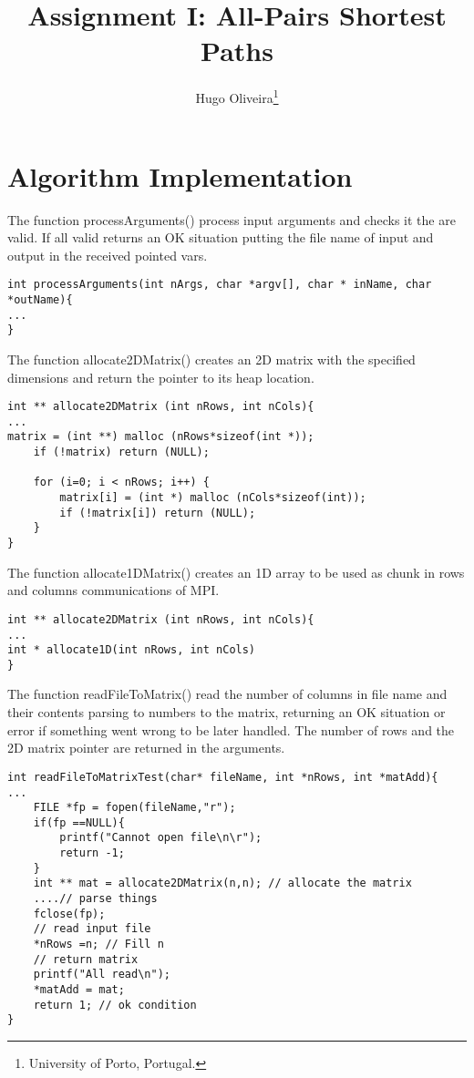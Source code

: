 \documentclass[10pt,a4paper,final]{report}
\begin{document}
\title{\LARGE \bf
 Assignment I: All-Pairs Shortest Paths
}


\author{Hugo Oliveira\footnote{University of Porto, Portugal.}}
\maketitle


\section{Algorithm Implementation}

The function processArguments() process input arguments and checks it the are valid. If all valid returns an OK situation putting the file name of input and output in the received pointed vars.
\begin{lstlisting}[label={lst_procArgs}]
int processArguments(int nArgs, char *argv[], char * inName, char *outName){
...
}
\end{lstlisting}

The function allocate2DMatrix() creates an 2D matrix with the specified dimensions and return the pointer to its heap location.
\begin{lstlisting}[label={lst_alloc2D}]
int ** allocate2DMatrix (int nRows, int nCols){
...
matrix = (int **) malloc (nRows*sizeof(int *));
	if (!matrix) return (NULL);

	for (i=0; i < nRows; i++) {
		matrix[i] = (int *) malloc (nCols*sizeof(int));
		if (!matrix[i]) return (NULL);
	}
}
\end{lstlisting}

The function allocate1DMatrix() creates an 1D array to be used as chunk in rows and columns communications of MPI.
\begin{lstlisting}
int ** allocate2DMatrix (int nRows, int nCols){
...
int * allocate1D(int nRows, int nCols)
}
\end{lstlisting}


The function readFileToMatrix() read the number of columns in file name and their contents parsing to numbers to the matrix, returning an OK situation or error if something went wrong to be later handled. The number of rows and the 2D matrix pointer are returned in the arguments.
\begin{lstlisting}
int readFileToMatrixTest(char* fileName, int *nRows, int *matAdd){
...
	FILE *fp = fopen(fileName,"r");
	if(fp ==NULL){
		printf("Cannot open file\n\r");
		return -1;
	}
	int ** mat = allocate2DMatrix(n,n); // allocate the matrix
	....// parse things
	fclose(fp);
	// read input file
	*nRows =n; // Fill n
	// return matrix
	printf("All read\n");
	*matAdd = mat;
	return 1; // ok condition
}
\end{lstlisting}
\end{document}
